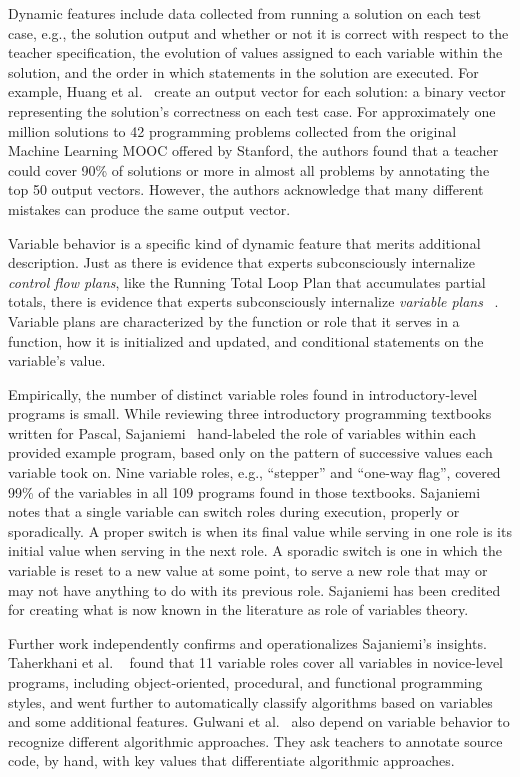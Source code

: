 Dynamic features include data collected from running a solution on each test case, e.g., the solution output and whether or not it is correct with respect to the teacher specification, the evolution of values assigned to each variable within the solution, and the order in which statements in the solution are executed. For example, Huang et al.~\cite{MOOCshop} create an output vector for each solution: a binary vector representing the solution's correctness on each test case. For approximately one million solutions to 42 programming problems collected from the original Machine Learning MOOC offered by Stanford, the authors found that a teacher could cover 90\% of solutions or more in almost all problems by annotating the top 50 output vectors. However, the authors acknowledge that many different mistakes can produce the same output vector.


Variable behavior is a specific kind of dynamic feature that merits additional description. Just as there is evidence that experts subconsciously internalize {\it control flow plans}, like the Running Total Loop Plan that accumulates partial totals, there is evidence that experts subconsciously internalize {\it variable plans} ~\cite{variableplans}. Variable plans are characterized by the function or role that it serves in a function, how it is initialized and updated, and conditional statements on the variable's value. 

Empirically, the number of distinct variable roles found in introductory-level programs is small. While reviewing three introductory programming textbooks written for Pascal, Sajaniemi~\cite{sajaniemi2002empirical} hand-labeled the role of variables within each provided example program, based only on the pattern of successive values each variable took on. Nine variable roles, e.g., ``stepper'' and ``one-way flag'', covered 99\% of the variables in all 109 programs found in those textbooks. Sajaniemi notes that a single variable can switch roles during execution, properly or sporadically. A proper switch is when its final value while serving in one role is its initial value when serving in the next role. A sporadic switch is one in which the variable is reset to a new value at some point, to serve a new role that may or may not have anything to do with its previous role. Sajaniemi has been credited for creating what is now known in the literature as role of variables theory. 

Further work independently confirms and operationalizes Sajaniemi's insights. Taherkhani et al. ~\cite{taherkhani2010recognizing} found that 11 variable roles cover all variables in novice-level programs, including object-oriented, procedural, and functional programming styles, and went further to automatically classify algorithms based on variables and some additional features. Gulwani et al.~\cite{gulwani_fse14} also depend on variable behavior to recognize different algorithmic approaches. They ask teachers to annotate source code, by hand, with key values that differentiate algorithmic approaches. %

